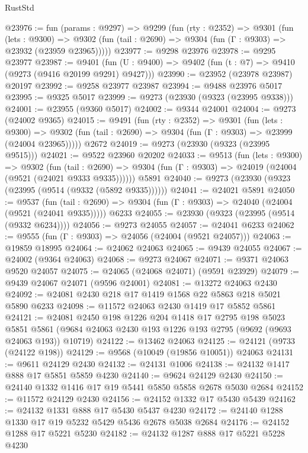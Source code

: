 \begin{lexlean}{RustStd}
\begin{coremodule}
{\begin{coremodule}
{{{{{{{{{{{{{{{{{{{{{{{{{{{{{{{{{{{{{{{{{{{{{{{{{{{{{{{@23976 := fun (params : @9297) =>
  @9299
    (fun (rty : @2352) =>
    @9301
      (fun (lets : @9300) =>
      @9302 (fun (tail : @2690) => @9304 (fun (Γ : @9303) => @23932 (@23959 @23965)))))
@23977 := @9298 @23976
@23978 := @9295 @23977
@23987 := @9401
    (fun (U : @9400) => @9402 (fun (t : @7) => @9410 (@9273 (@9416 @20199 @9291) @9427)))
@23990 := @23952 (@23978 @23987) @20197
@23992 := @9258 @23977 @23987
@23994 := @9488 @23976 @5017
@23995 := @9325 @5017
@23999 := @9273 (@23930 (@9323 (@23995 @9338)))
@24001 := @23955 (@9360 @5017)
@24002 := @9344 @24001
@24004 := @9273 (@24002 @9365)
@24015 := @9491
    (fun (rty : @2352) =>
    @9301
      (fun (lets : @9300) =>
      @9302 (fun (tail : @2690) => @9304 (fun (Γ : @9303) => @23999 (@24004 @23965)))))
    @2672
@24019 := @9273 (@23930 (@9323 (@23995 @9515)))
@24021 := @9522 @23960 @20202
@24033 := @9513
    (fun (lets : @9300) =>
    @9302
      (fun (tail : @2690) =>
      @9304 (fun (Γ : @9303) => @24019 (@24004 (@9521 (@24021 @9333 @9335))))))
    @5891
@24040 := @9273 (@23930 (@9323 (@23995 (@9514 (@9332 (@5892 @9335))))))
@24041 := @24021 @5891
@24050 := @9537
    (fun (tail : @2690) => @9304 (fun (Γ : @9303) => @24040 (@24004 (@9521 (@24041 @9335)))))
    @6233
@24055 := @23930 (@9323 (@23995 (@9514 (@9332 @6234))))
@24056 := @9273 @24055
@24057 := @24041 @6233
@24062 := @9555 (fun (Γ : @9303) => @24056 (@24004 (@9521 @24057)))
@24063 := @19859 @18995
@24064 := @24062 @24063
@24065 := @9439 @24055
@24067 := @24002 (@9364 @24063)
@24068 := @9273 @24067
@24071 := @9371 @24063 @9520 @24057
@24075 := @24065 (@24068 @24071) (@9591 @23929)
@24079 := @9439 @24067 @24071 (@9596 @24001)
@24081 := @13272 @24063 @2430
@24092 := @24081 @2430 @218 @17 @1419 @1568 @22 @5863 @218 @5021 @5890 @6233
@24098 := @11572 @24063 @2430 @1419 @17 @5852 @5861
@24121 := @24081
    @2450
    @198
    @1226
    @204
    @1418
    @17
    @2795
    @198
    @5023
    @5851
    @5861
    (@9684 @24063 @2430 @193 @1226 @193 @2795 (@9692 (@9693 @24063 @193)) @10719)
@24122 := @13462 @24063
@24125 := @24121 (@9733 (@24122 @198))
@24129 := @9568 (@10049 (@19856 @10051)) @24063
@24131 := @9611 @24129 @2430
@24132 := @24131 @1006
@24138 := @24132 @1417 @888 @17 @5851 @5859 @4230
@24140 := @9624 @24129 @2430
@24150 := @24140 @1332 @1416 @17 @19 @5441 @5850 @5858 @2678 @5030 @2684
@24152 := @11572 @24129 @2430
@24156 := @24152 @1332 @17 @5430 @5439
@24162 := @24132 @1331 @888 @17 @5430 @5437 @4230
@24172 := @24140 @1288 @1330 @17 @19 @5232 @5429 @5436 @2678 @5038 @2684
@24176 := @24152 @1288 @17 @5221 @5230
@24182 := @24132 @1287 @888 @17 @5221 @5228 @4230
}}}}}}}}}}}}}}}}}}}}}}}}}}}}}}}}}}}}}}}}}}}}}}}}}}}}}}}
\end{coremodule}}
\end{coremodule}
\end{lexlean}
